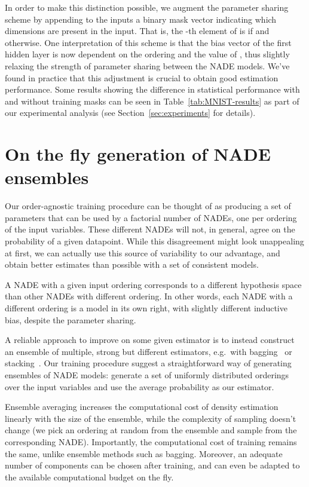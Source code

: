 \documentclass{article}
\begin{document}
\newcommand{\mask}{m_{o_{<d}}}
In order to make this distinction possible, we augment the parameter sharing
scheme by appending to the inputs a binary mask vector 
indicating which dimensions are present in the input. That is, the -th
element of  is  if  and  otherwise.
One interpretation of this scheme is that the bias vector  of the first
hidden layer is now dependent on the ordering  and the value of , thus
slightly relaxing the strength of parameter sharing between the NADE models.
We've found in practice that this adjustment is crucial to obtain good
estimation performance. Some results showing the difference in statistical
performance with and without training masks can be seen in
Table~\ref{tab:MNIST-results} as part of our experimental analysis (see
Section~\ref{sec:experiments} for details).

\section{On the fly generation of NADE ensembles}
Our order-agnostic training procedure can be thought of as
producing a set of parameters that can be used by a factorial number
of NADEs, one per ordering of the input variables.  These different
NADEs will not, in general, agree on the probability of a given
datapoint. While this disagreement might look unappealing at first, we can
actually use this source of variability to our advantage, and obtain better
estimates than possible with a set of consistent models.

A NADE with a given input ordering corresponds to a different hypothesis
space than other NADEs with different ordering. In other words, each
NADE with a different ordering is a model in its own right, with slightly different inductive bias, despite
the parameter sharing.

A reliable approach to improve on some given estimator
is to instead construct an ensemble of multiple, strong but different
estimators, e.g.\ with bagging~\cite{Ormoneit1995} or stacking~\cite{Smyth1999}.
Our training procedure suggest a straightforward way of generating
ensembles of NADE models: generate a set of uniformly distributed
orderings  over the input variables and use the
average probability  as our estimator.

Ensemble averaging increases the computational cost of density estimation linearly
with the size of the ensemble, while the complexity of sampling
doesn't change (we pick an ordering  at random from the
ensemble and sample from the corresponding NADE)\@.  Importantly, the
computational cost of training remains the same, unlike ensemble
methods such as bagging. Moreover, an adequate number of components
can be chosen after training, and can even be adapted to the available
computational budget on the fly.
\end{document}
